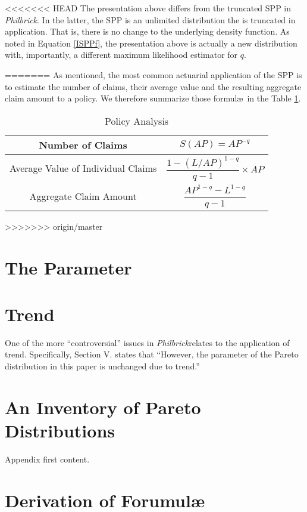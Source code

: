 \documentclass[]{article} %
\newcommand{\philbrick}{\textit{Philbrick}}
\begin{document}
<<<<<<< HEAD
The presentation above differs from the truncated SPP in \philbrick. In the latter, the SPP is an unlimited distribution the is truncated in application. That is, there is no change to the underlying density function. As noted in Equation \ref{ISPPf}, the presentation above is actually a new distribution with, importantly, a different maximum likelihood estimator for $q$.


=======
As mentioned, the most common actuarial application of the SPP is to estimate the number of claims, their average value and the resulting aggregate claim amount to a policy. We therefore summarize those formul\ae~in the Table \ref{tbl:PolicyFormulas}.
\begin{table}[h!]
	\centering
	\begin{tabular}[h]{cc}
		\toprule
		Number of Claims & $S(AP) = AP^{-q}$\\ \midrule
		Average Value of Individual Claims & $\dfrac{1 - (L/AP)^{1-q}}{q-1} \times AP$\\ \midrule
		Aggregate Claim Amount & $\dfrac{AP^{1-q} - L^{1-q}}{q-1}$\\
		\bottomrule
	\end{tabular}
	\caption{Policy Analysis}\label{tbl:PolicyFormulas}			
\end{table}
 
>>>>>>> origin/master
\section{The Parameter}
\section{Trend}
One of the more ``controversial'' issues in \philbrick relates to the application of trend. Specifically, Section V. states that ``However, the parameter of the Pareto distribution in this paper is unchanged due to trend.''

\newpage
\appendix
\appendixpage

\section{An Inventory of Pareto Distributions}\label{ParetoInventory}
Appendix first content.
\section{Derivation of Forumul\ae}
\end{document}
